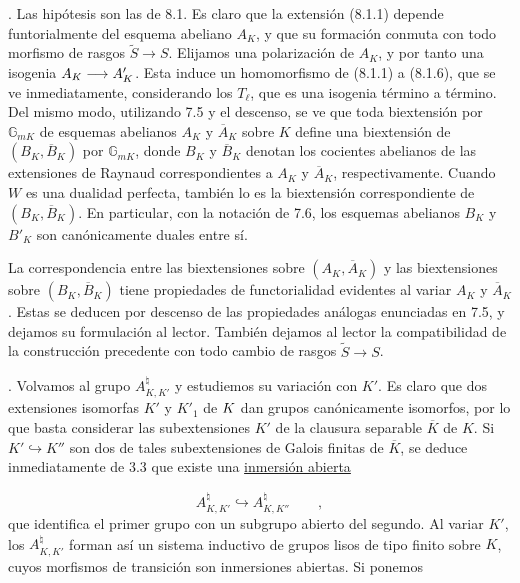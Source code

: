 
\medskip
{}. Las hipótesis son las de 8.1. Es claro que la extensión (8.1.1)
depende funtorialmente del esquema abeliano $A_K$, y que su formación
conmuta con todo morfismo de rasgos $\widetilde S\longrightarrow S$.
Elijamos una polarización de $A_K$, y por tanto una isogenia
$A_K\longrightarrow\sisi{A_{K'}}{A'_K}$. Esta induce un homomorfismo de (8.1.1) a
(8.1.6), que se ve inmediatamente, considerando los $T_\ell$, que es
una isogenia término a término. Del mismo modo, utilizando 7.5 y el
descenso, se ve que toda biextensión por $\mathbb{G}_{mK}$ de esquemas
abelianos $A_K$ y $\overline A_K$ sobre $K$ define una biextensión de
$(B_K,\overline B_K)$ por $\mathbb{G}_{mK}$, donde $B_K$ y
$\overline B_K$ denotan los cocientes abelianos de las extensiones de
Raynaud correspondientes a $A_K$ y $\overline A_K$, respectivamente.
Cuando $W$ es una dualidad perfecta, también lo es la biextensión
correspondiente de $(B_K,\overline B_K)$. En particular, con la notación
de 7.6, los esquemas abelianos $B_K$ y $B'_K$ son canónicamente duales
entre sí.

La correspondencia entre las biextensiones sobre $(A_K,\overline A_K)$
y las biextensiones sobre $(B_K,\overline B_K)$ tiene propiedades de
functorialidad evidentes al variar $A_K$ y $\overline A_K$. Estas se
deducen por descenso de las propiedades análogas enunciadas en 7.5, y
dejamos su formulación al lector. También dejamos al lector la
compatibilidad de la construcción precedente con todo cambio de rasgos
$\widetilde S\longrightarrow S$.

\medskip
{}. Volvamos al grupo $A_{K,K'}^{\natural}$ y estudiemos su variación
con $K'$. Es claro que dos extensiones isomorfas $K'$ y $K'_1$ de
$\sisi{K'}{K}$ dan grupos canónicamente isomorfos, por lo que basta
considerar las subextensiones $K'$ de la clausura separable
$\overline K$ de $K$. Si $K'\hookrightarrow K''$ son dos de tales
subextensiones de Galois finitas de $\overline K$, se deduce
inmediatamente de 3.3 que existe una \underline{inmersión abierta}


\begin{equation}\tag{8.3.1}
A^{\natural}_{K,K'} \hookrightarrow A^{\natural}_{K,K''}
 \qquad ,
\end{equation}
que identifica el primer grupo con un subgrupo abierto del segundo. Al
variar $K'$, los $A^{\natural}_{K,K'}$ forman así un sistema inductivo
de grupos lisos de tipo finito sobre $K$, cuyos morfismos de transición
son inmersiones abiertas. Si ponemos

